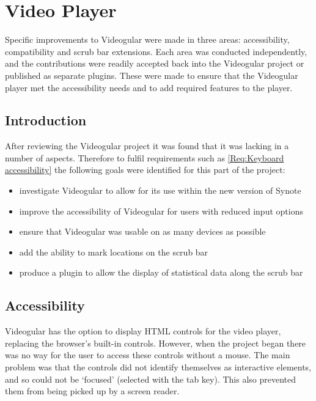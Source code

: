 
\chapter{Video Player}
\label{Chapter:Video Player}

\begin{preamble}
	Specific improvements to \gls{Videogular} were made in three areas: accessibility, compatibility and scrub bar extensions. Each area was conducted independently, and the contributions were readily accepted back into the \gls{Videogular} project or published as separate plugins. These were made to ensure that the \gls{Videogular} player met the accessibility needs and to add required features to the player.
\end{preamble}

\section{Introduction}

After reviewing the \gls{Videogular} project it was found that it was lacking in a number of aspects. Therefore to fulfil requirements such as \cref{Req:Keyboard accessibility} the following goals were identified for this part of the project:

\begin{itemize}
	\item investigate \gls{Videogular} to allow for its use within the new version of Synote
	\item improve the accessibility of \gls{Videogular} for users with reduced input options
	\item ensure that \gls{Videogular} was usable on as many devices as possible
	\item add the ability to mark locations on the \gls{scrub bar}
	\item produce a plugin to allow the display of statistical data along the \gls{scrub bar}
\end{itemize}

\section{Accessibility}
\label{Section:Accessibility}
\gls{Videogular} has the option to display HTML controls for the video player, replacing the browser's built-in controls. However, when the project began there was no way for the user to access these controls without a mouse. The main problem was that the controls did not identify themselves as interactive elements, and so could not be `focused' (selected with the tab key). This also prevented them from being picked up by a screen reader.

